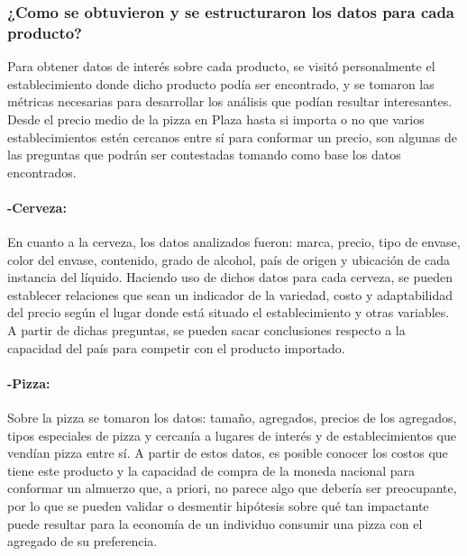\hypertarget{como-se-obtuvieron-y-se-estructuraron-los-datos-para-cada-producto}{%
\subsubsection{¿Como se obtuvieron y se estructuraron los datos para
cada
producto?}\label{como-se-obtuvieron-y-se-estructuraron-los-datos-para-cada-producto}}

Para obtener datos de interés sobre cada producto, se visitó
personalmente el establecimiento donde dicho producto podía ser
encontrado, y se tomaron las métricas necesarias para desarrollar los
análisis que podían resultar interesantes. Desde el precio medio de la
pizza en Plaza hasta si importa o no que varios establecimientos estén
cercanos entre sí para conformar un precio, son algunas de las preguntas
que podrán ser contestadas tomando como base los datos encontrados.

\hypertarget{-cerveza}{%
\paragraph{-Cerveza:}\label{-cerveza}}

En cuanto a la cerveza, los datos analizados fueron: marca, precio, tipo
de envase, color del envase, contenido, grado de alcohol, país de origen
y ubicación de cada instancia del líquido. Haciendo uso de dichos datos
para cada cerveza, se pueden establecer relaciones que sean un indicador
de la variedad, costo y adaptabilidad del precio según el lugar donde
está situado el establecimiento y otras variables. A partir de dichas
preguntas, se pueden sacar conclusiones respecto a la capacidad del país
para competir con el producto importado.

\hypertarget{-pizza}{%
\paragraph{-Pizza:}\label{-pizza}}

Sobre la pizza se tomaron los datos: tamaño, agregados, precios de los
agregados, tipos especiales de pizza y cercanía a lugares de interés y
de establecimientos que vendían pizza entre sí. A partir de estos datos,
es posible conocer los costos que tiene este producto y la capacidad de
compra de la moneda nacional para conformar un almuerzo que, a priori,
no parece algo que debería ser preocupante, por lo que se pueden validar
o desmentir hipótesis sobre qué tan impactante puede resultar para la
economía de un individuo consumir una pizza con el agregado de su
preferencia.

